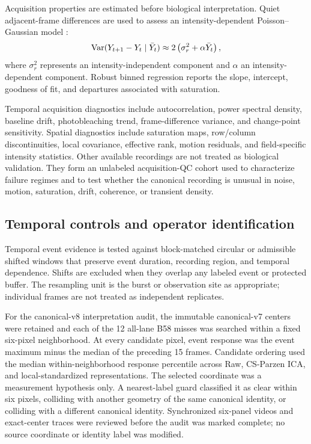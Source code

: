 Acquisition properties are estimated before biological interpretation. Quiet adjacent-frame differences are used to assess an intensity-dependent Poisson--Gaussian model \citep{foi2008poissongaussian}:
\begin{equation}
  \operatorname{Var}(Y_{t+1}-Y_t\mid \bar Y_t)
  \approx 2\left(\sigma_r^2+\alpha \bar Y_t\right),
\end{equation}
where $\sigma_r^2$ represents an intensity-independent component and $\alpha$ an intensity-dependent component. Robust binned regression reports the slope, intercept, goodness of fit, and departures associated with saturation.

Temporal acquisition diagnostics include autocorrelation, power spectral density, baseline drift, photobleaching trend, frame-difference variance, and change-point sensitivity. Spatial diagnostics include saturation maps, row/column discontinuities, local covariance, effective rank, motion residuals, and field-specific intensity statistics. Other available recordings are not treated as biological validation. They form an unlabeled acquisition-QC cohort used to characterize failure regimes and to test whether the canonical recording is unusual in noise, motion, saturation, drift, coherence, or transient density.

\subsection{Temporal controls and operator identification}

Temporal event evidence is tested against block-matched circular or admissible shifted windows that preserve event duration, recording region, and temporal dependence. Shifts are excluded when they overlap any labeled event or protected buffer. The resampling unit is the burst or observation site as appropriate; individual frames are not treated as independent replicates.

For the canonical-v8 interpretation audit, the immutable canonical-v7 centers
were retained and each of the 12 all-lane B58 misses was searched within a
fixed six-pixel neighborhood. At every candidate pixel, event response was the
event maximum minus the median of the preceding 15 frames. Candidate ordering
used the median within-neighborhood response percentile across Raw, CS-Parzen
ICA, and local-standardized representations. The selected coordinate was a
measurement hypothesis only. A nearest-label guard classified it as clear
within six pixels, colliding with another geometry of the same canonical
identity, or colliding with a different canonical identity. Synchronized
six-panel videos and exact-center traces were reviewed before the audit was
marked complete; no source coordinate or identity label was modified.

